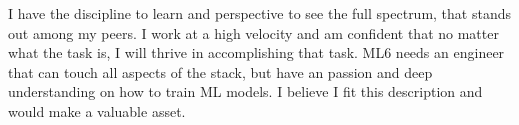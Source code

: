 \documentclass[11pt, a4paper]{awesome-cv}
\begin{document}
\begin{cvletter}
I have the discipline to learn and perspective to see the full spectrum, that stands out among my peers. I work at a high velocity and am confident that no matter what the task is, I will thrive in accomplishing that task. ML6 needs an engineer that can touch all aspects of the stack, but have an passion and deep understanding on how to train ML models. I believe I fit this description and would make a valuable asset.

\end{cvletter}


\makeletterclosing
\end{document}
